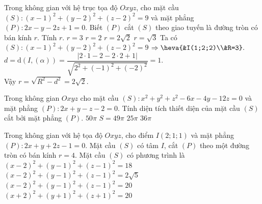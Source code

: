 \begin{ex}%
	Trong không gian với hệ trục tọa độ $Oxyz$, cho mặt cầu $(S) \colon (x-1)^2+(y-2)^2+(z-2)^2=9$ và mặt phẳng $(P) \colon 2x-y-2z+1=0$. Biết $(P)$ cắt $(S)$ theo giao tuyến là đường tròn có bán kính $r$. Tính $r$.
	\choice
	{$r=3$}
	{$r=2$}
	{\True $r=2\sqrt{2}$}
	{$r=\sqrt{3}$}
	\loigiai
	{Ta có $(S) \colon (x-1)^2+(y-2)^2+(z-2)^2=9$ $\Rightarrow \heva{&I(1;2;2)\\&R=3}.$\\ $d=\mathrm{d}\left(I,(\alpha)\right)=\dfrac{|2\cdot1-2-2\cdot2+1|}{\sqrt{2^2+(-1)^2+(-2)^2}}=1.$\\
		Vậy	$r=\sqrt{R^2-d^2}=2\sqrt{2}$.}
\end{ex}
\begin{ex}%
	Trong không gian $Oxyz$ cho mặt cầu $(S)\colon x^2+y^2+z^2-6x-4y-12z=0$ và mặt phẳng $(P)\colon 2x+y-z-2=0$. Tính diện tích thiết diện của mặt cầu $(S)$ cắt bởi mặt phẳng $(P)$.
	\choice
	{$50\pi $}
	{\True $S=49\pi $}
	{$25\pi $}
	{$36\pi $}
\end{ex}
\begin{ex}%
	Trong không gian với hệ tọa độ $Oxyz$, cho điểm $I(2;1;1)$ và mặt phẳng $(P)\colon 2x+y+2z-1=0$. Mặt cầu $(S)$ có tâm $I$, cắt $(P)$ theo một đường tròn có bán kính $r=4$. Mặt cầu $(S)$ có phương trình là
	\choice
	{$(x-2)^2 + (y-1)^2 + (z-1)^2 =18$}
	{$(x-2)^2 + (y-1)^2 +(z-1)^2 = 2\sqrt{5}$}
	{\True $(x-2)^2 + (y-1)^2 + (z-1)^2 =20$}
	{$(x+2)^2 + (y+1)^2 + (z+1)^2 =20$}
\end{ex}
